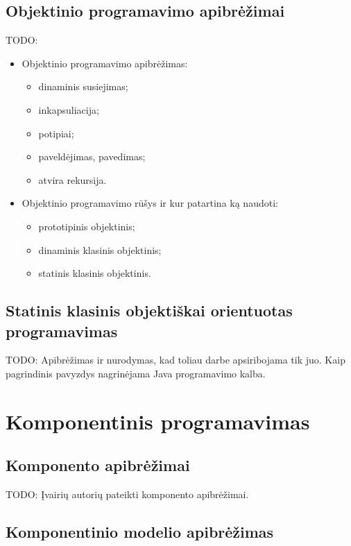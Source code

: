 \section{Objektinio programavimo apibrėžimai}

TODO:
\begin{itemize}
  \item Objektinio programavimo apibrėžimas:
    \begin{itemize}
      \item dinaminis susiejimas;
      \item inkapsuliacija;
      \item potipiai;
      \item paveldėjimas, pavedimas;
      \item atvira rekursija.
    \end{itemize}
  \item Objektinio programavimo rūšys ir kur patartina ką naudoti:
    \begin{itemize}
      \item prototipinis objektinis;
      \item dinaminis klasinis objektinis;
      \item statinis klasinis objektinis.
    \end{itemize}
\end{itemize}

\section{Statinis klasinis objektiškai orientuotas programavimas}

TODO: Apibrėžimas ir nurodymas, kad toliau darbe apsiribojama tik juo.
Kaip pagrindinis pavyzdys nagrinėjama Java programavimo kalba.

\chapter{Komponentinis programavimas}

\section{Komponento apibrėžimai}

TODO: Įvairių autorių pateikti komponento apibrėžimai.

\section{Komponentinio modelio apibrėžimas}

